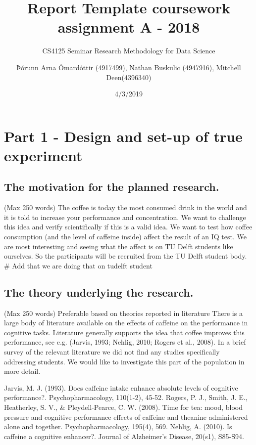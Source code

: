 \documentclass[]{article}
\title{Report Template coursework assignment A - 2018}
\subtitle{CS4125 Seminar Research Methodology for Data Science}
\author{Þórunn Arna Ómardóttir (4917499), Nathan Buskulic (4947916), Mitchell
Deen(4396340)}
\date{4/3/2019}
\begin{document}
\maketitle

\tableofcontents

\section{Part 1 - Design and set-up of true
experiment}\label{part-1---design-and-set-up-of-true-experiment}

\subsection{The motivation for the planned
research.}\label{the-motivation-for-the-planned-research.}

(Max 250 words) The coffee is today the most consumed drink in the world
and it is told to increase your performance and concentration. We want
to challenge this idea and verify scientifically if this is a valid
idea. We want to test how coffee consumption (and the level of caffeine
inside) affect the result of an IQ test. We are most interesting and
seeing what the affect is on TU Delft students like ourselves. So the
participants will be recruited from the TU Delft student body. \# Add
that we are doing that on tudelft student

\subsection{The theory underlying the
research.}\label{the-theory-underlying-the-research.}

(Max 250 words) Preferable based on theories reported in literature
There is a large body of literature available on the effects of caffeine
on the performance in cognitive tasks. Literature generally supports the
idea that coffee improves this performance, see e.g. (Jarvis, 1993;
Nehlig, 2010; Rogers et al., 2008). In a brief survey of the relevant
literature we did not find any studies specifically addressing students.
We would like to investigate this part of the population in more detail.

Jarvis, M. J. (1993). Does caffeine intake enhance absolute levels of
cognitive performance?. Psychopharmacology, 110(1-2), 45-52. Rogers, P.
J., Smith, J. E., Heatherley, S. V., \& Pleydell-Pearce, C. W. (2008).
Time for tea: mood, blood pressure and cognitive performance effects of
caffeine and theanine administered alone and together.
Psychopharmacology, 195(4), 569. Nehlig, A. (2010). Is caffeine a
cognitive enhancer?. Journal of Alzheimer's Disease, 20(s1), S85-S94.
\end{document}
